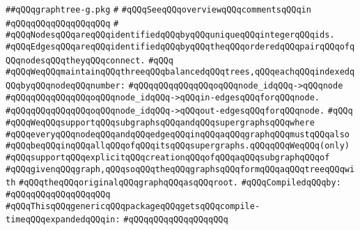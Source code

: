 \label{src/lib/std/graphtree/graphtree-g.pkg}
\verb|##qQQqgraphtree-g.pkg|\newline
\verb|#|\newline
\verb|#qQQqSeeqQQqoverviewqQQqcommentsqQQqin|\newline
\verb|#qQQqqQQqqQQqqQQqqQQq|\newline
\verb|#|\newline
\verb|#qQQqNodesqQQqareqQQqidentifiedqQQqbyqQQquniqueqQQqintegerqQQqids.|\newline
\verb|#qQQqEdgesqQQqareqQQqidentifiedqQQqbyqQQqtheqQQqorderedqQQqpairqQQqofqQQqnodesqQQqtheyqQQqconnect.|\newline
\verb|#qQQq|\newline
\verb|#qQQqWeqQQqmaintainqQQqthreeqQQqbalancedqQQqtrees,qQQqeachqQQqindexedqQQqbyqQQqnodeqQQqnumber:|\newline
\verb|#qQQqqQQqqQQqqQQqoqQQqnode_idqQQq->qQQqnode|\newline
\verb|#qQQqqQQqqQQqqQQqoqQQqnode_idqQQq->qQQqin-edgesqQQqforqQQqnode.|\newline
\verb|#qQQqqQQqqQQqqQQqoqQQqnode_idqQQq->qQQqout-edgesqQQqforqQQqnode.|\newline
\verb|#qQQq|\newline
\verb|#qQQqWeqQQqsupportqQQqsubgraphsqQQqandqQQqsupergraphsqQQqwhere|\newline
\verb|#qQQqeveryqQQqnodeqQQqandqQQqedgeqQQqinqQQqaqQQqgraphqQQqmustqQQqalso|\newline
\verb|#qQQqbeqQQqinqQQqallqQQqofqQQqitsqQQqsupergraphs.qQQqqQQqWeqQQq(only)|\newline
\verb|#qQQqsupportqQQqexplicitqQQqcreationqQQqofqQQqaqQQqsubgraphqQQqof|\newline
\verb|#qQQqgivenqQQqgraph,qQQqsoqQQqtheqQQqgraphsqQQqformqQQqaqQQqtreeqQQqwith|\newline
\verb|#qQQqtheqQQqoriginalqQQqgraphqQQqasqQQqroot.|\newline
\newline
\verb|#qQQqCompiledqQQqby:|\newline
\verb|#qQQqqQQqqQQqqQQqqQQq|\newline
\newline
\verb|#qQQqThisqQQqgenericqQQqpackageqQQqgetsqQQqcompile-timeqQQqexpandedqQQqin:|\newline
\verb|#qQQqqQQqqQQqqQQqqQQq|\newline
